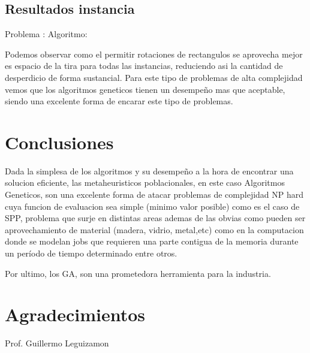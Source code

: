 \documentclass[10pt]{article}
\begin{document}
\subsection{Resultados instancia}%

\label{subsec:}%

Problema :  \newline%
%
 Algoritmo: %


Podemos observar como el permitir rotaciones de rectangulos se aprovecha mejor es espacio de la tira para todas las instancias, reduciendo asi la cantidad de desperdicio de forma sustancial. Para este tipo de problemas de alta complejidad vemos que los algoritmos geneticos tienen un desempeño mas que aceptable, siendo una excelente forma de encarar este tipo de problemas.


\section{Conclusiones}
Dada la simplesa de los algoritmos y su desempeño a la hora de encontrar una solucion eficiente, las metaheuristicos poblacionales, en este caso Algoritmos Geneticos, son una excelente forma de atacar problemas de complejidad NP hard cuya funcion de evaluacion sea simple (minimo valor posible) como es el caso de SPP, problema que surje en distintas areas ademas de las obvias como pueden ser aprovechamiento de material (madera, vidrio, metal,etc) como en la computacion donde se modelan jobs que requieren una parte contigua de la memoria durante un período de tiempo determinado entre otros.

Por ultimo, los GA, son una prometedora herramienta para la industria.

\section*{Agradecimientos}
Prof. Guillermo Leguizamon

\end{document}
